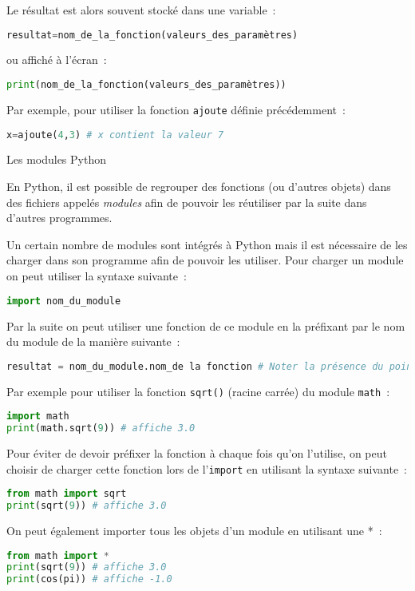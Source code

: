 Le résultat est alors souvent stocké dans une variable~:
\begin{lstlisting}[language=Python]
resultat=nom_de_la_fonction(valeurs_des_paramètres)
\end{lstlisting}
ou affiché à l'écran~:
\begin{lstlisting}[language=Python]
print(nom_de_la_fonction(valeurs_des_paramètres))
\end{lstlisting}
Par exemple, pour utiliser la fonction \texttt{ajoute} définie précédemment~:
 \begin{lstlisting}[language=Python]
x=ajoute(4,3) # x contient la valeur 7
\end{lstlisting}
\begin{h2} Les modules Python \end{h2}
En Python, il est possible de regrouper des fonctions (ou d'autres objets) dans des fichiers appelés \textit{modules} afin de pouvoir les réutiliser par la suite dans d'autres programmes.
\par
Un certain nombre de modules sont intégrés à Python mais il est nécessaire de les charger dans son programme afin de pouvoir les utiliser. Pour charger un module on peut utiliser la syntaxe suivante~:
\begin{lstlisting}[language=Python]
import nom_du_module
\end{lstlisting}
Par la suite on peut utiliser une fonction de ce module en la préfixant par le nom du module de la manière suivante~:
\begin{lstlisting}[language=Python]
resultat = nom_du_module.nom_de la fonction # Noter la présence du point
\end{lstlisting}
Par exemple pour utiliser la fonction \texttt{sqrt()} (racine carrée) du module \texttt{math}~:
\begin{lstlisting}[language=Python]
import math
print(math.sqrt(9)) # affiche 3.0
\end{lstlisting}
Pour éviter de devoir préfixer la fonction à chaque fois qu'on l'utilise, on peut choisir de charger cette fonction lors de l'\texttt{import} en utilisant la syntaxe suivante~:
  \begin{lstlisting}[language=Python]
from math import sqrt
print(sqrt(9)) # affiche 3.0 
\end{lstlisting}
On peut également importer tous les objets d'un module en utilisant une *~:
  \begin{lstlisting}[language=Python]
from math import *
print(sqrt(9)) # affiche 3.0 
print(cos(pi)) # affiche -1.0 
\end{lstlisting}
